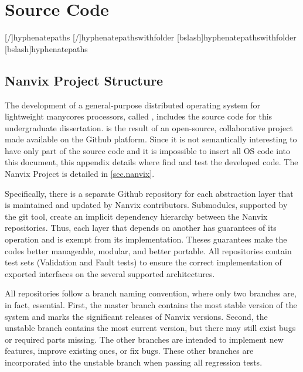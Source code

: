 \chapter{Source Code}
\label{ch:source-code}

\newmenumacro{\nixfile}[/]{hyphenatepaths}
\newmenumacro{\nixpath}[/]{hyphenatepathswithfolder}
\newmenumacro{\winpath}[bslash]{hyphenatepathswithfolder}
\newmenumacro{\winfile}[bslash]{hyphenatepaths}

\section{Nanvix Project Structure}

    The development of a general-purpose distributed operating system for
    lightweight manycores processors, called \nanvixos, includes the source
    code for this undergraduate dissertation. \nanvixos is the result of an
    open-source, collaborative project made available on the Github platform.
    Since it is not semantically interesting to have only part of the source
    code and it is impossible to insert all OS code into this document, this
    appendix details where find and test the developed code. The Nanvix
    Project is detailed in \autoref{sec.nanvix}.

    Specifically, there is a separate Github repository for each abstraction
    layer that is maintained and updated by Nanvix contributors. Submodules,
    supported by the git tool, create an implicit dependency hierarchy
    between the Nanvix repositories. Thus, each layer that depends on another
    has guarantees of its operation and is exempt from its implementation.
    Theses guarantees make the codes better manageable, modular, and better
    portable. All repositories contain test sets (Validation and Fault tests)
    to ensure the correct implementation of exported interfaces on the several
    supported architectures.

    All repositories follow a branch naming convention, where only two
    branches are, in fact, essential. First, the master branch contains
    the most stable version of the system and marks the significant
    releases of Nanvix versions. Second, the unstable branch contains
    the most current version, but there may still exist bugs or required
    parts missing. The other branches are intended to implement new features,
    improve existing ones, or fix bugs. These other branches are incorporated
    into the unstable branch when passing all regression tests.

